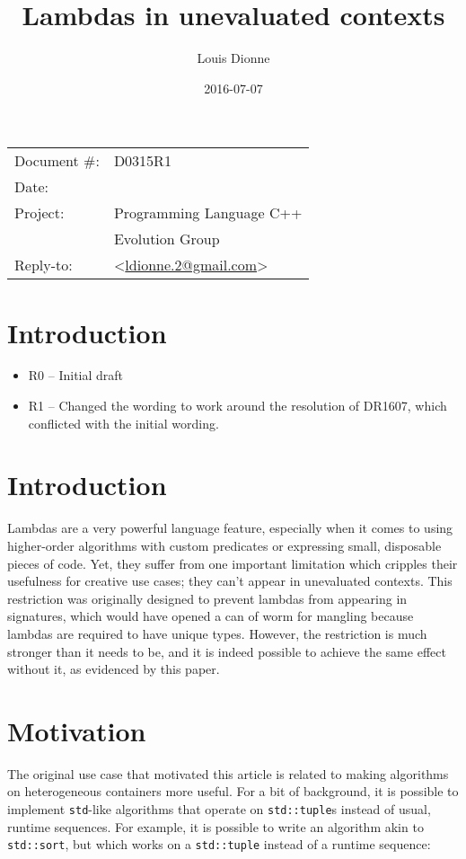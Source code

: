 \documentclass[11pt]{article}
\date{}
\title{Lambdas in unevaluated contexts}
\author{}
\newcommand{\cc}[1]{\texttt{#1}}
\begin{document}
\maketitle\vspace{-2cm}

\begin{flushright}
  \begin{tabular}{ll}
  Document \#:&D0315R1\\
  Date:       &\date{2016-07-07}\\
  Project:    &Programming Language C++\\
              &Evolution Group\\
  Reply-to:   &\author{Louis Dionne} \textless\href{mailto:ldionne.2@gmail.com}{ldionne.2@gmail.com}\textgreater
  \end{tabular}
\end{flushright}

\section{Introduction}
\begin{itemize}
  \item R0 -- Initial draft
  \item R1 -- Changed the wording to work around the resolution of DR1607,
              which conflicted with the initial wording.
\end{itemize}


\section{Introduction}
Lambdas are a very powerful language feature, especially when it comes to using
higher-order algorithms with custom predicates or expressing small, disposable
pieces of code. Yet, they suffer from one important limitation which cripples
their usefulness for creative use cases; they can't appear in unevaluated
contexts. This restriction was originally designed to prevent lambdas from
appearing in signatures, which would have opened a can of worm for mangling
because lambdas are required to have unique types. However, the restriction is
much stronger than it needs to be, and it is indeed possible to achieve the
same effect without it, as evidenced by this paper.


\section{Motivation}
The original use case that motivated this article is related to making algorithms
on heterogeneous containers more useful. For a bit of background, it is possible
to implement \cc{std}-like algorithms that operate on \cc{std::tuple}s instead of
usual, runtime sequences. For example, it is possible to write an algorithm akin
to \cc{std::sort}, but which works on a \cc{std::tuple} instead of a runtime
sequence:
\end{document}
